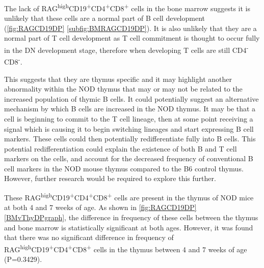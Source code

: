 
The lack of RAG\textsuperscript{high}CD19\textsuperscript{+}CD4\textsuperscript{+}CD8\textsuperscript{+} cells in the bone marrow suggests it is unlikely that these cells are a normal part of B cell development (\cref{fig:RAGCD19DP} \ref{subfig:BMRAGCD19DP}). %
It is also unlikely that they are a normal part of T cell development as T cell commitment is thought to occur fully in the DN development stage, therefore when developing T cells are still CD4\textsuperscript{-}CD8\textsuperscript{-}.

This suggests that they are thymus specific and it may highlight another abnormality within the NOD thymus that may or may not be related to the increased population of thymic B cells.
It could potentially suggest an alternative mechanism by which B cells are increased in the NOD thymus. 
It may be that a cell is beginning to commit to the T cell lineage, then at some point receiving a signal which is causing it to begin switching lineages and start expressing B cell markers.
These cells could then potentially redifferentiate fully into B cells.
This potential redifferentiation could explain the existence of both B and T cell markers on the cells, and account for the decreased frequency of conventional B cell markers in the NOD mouse thymus compared to the B6 control thymus.
However, further research would be required to explore this further.

These RAG\textsuperscript{high}CD19\textsuperscript{+}CD4\textsuperscript{+}CD8\textsuperscript{+} cells are present in the thymus of NOD mice at both 4 and 7 weeks of age.
As shown in \cref{fig:RAGCD19DP} \ref{BMvThyDPgraph}, the difference in frequency of these cells between the thymus and bone marrow is statistically significant at both ages.
However, it was found that there was no significant difference in frequency of RAG\textsuperscript{high}CD19\textsuperscript{+}CD4\textsuperscript{+}CD8\textsuperscript{+} cells in the thymus between 4 and 7 weeks of age (P=0.3429).

